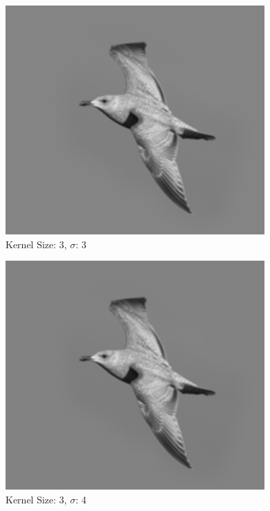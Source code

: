 \documentclass{article}
\begin{document}
\begin{minipage}{\linewidth}
    \centering
    \begin{minipage}{0.45\linewidth}
        \begin{figure}[H]
			\includegraphics[width=\linewidth]{Ejercicio1a/gaussiana(3,3)3.png} 
            \caption{Kernel Size: 3, $\sigma$: 3}
        \end{figure}
    \end{minipage}
    \hspace{0.05\linewidth}
    \begin{minipage}{0.45\linewidth}
        \begin{figure}[H]
            \includegraphics[width=\linewidth]{Ejercicio1a/gaussiana(3,3)4.png}
            \caption{Kernel Size: 3, $\sigma$: 4}
        \end{figure}
    \end{minipage}
    

\end{minipage}
\end{document}
